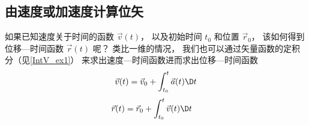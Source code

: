 \subsection{由速度或加速度计算位矢}

如果已知速度关于时间的函数 $\vec v(t)$， 以及初始时间 $t_0$ 和位置 $\vec r_0$， 该如何得到位移—时间函数 $\vec r(t)$ 呢？ 类比一维的情况， 我们也可以通过矢量函数的定积分（见\autoref{IntV_ex1}） 来求出速度—时间函数进而求出位移—时间函数
\begin{equation}\label{VnA_eq7}
\vec v(t) = \vec v_0 + \int_{t_0}^{t} \vec a(t) \D t
\end{equation}
\begin{equation}\label{VnA_eq8}
\begin{aligned}
\vec r(t) &= \vec r_0 + \int_{t_0}^{t} \vec v(t) \D t
\end{aligned}\end{equation}










